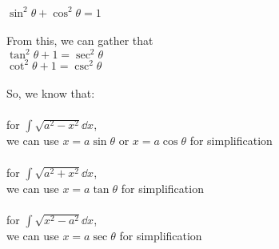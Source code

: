 $\sin^2\theta + \cos^2\theta = 1$\\
\\
From this, we can gather that\\
$\tan^2\theta + 1 = \sec^2\theta$\\
$\cot^2\theta + 1 = \csc^2\theta$\\
\\
So, we know that:\\
\\
for $\int\sqrt{a^2 - x^2} \dd x$,\\
we can use $x =  a\sin \theta$ or $x =  a\cos \theta$ for simplification\\
\\
for $\int\sqrt{a^2 + x^2} \dd x$,\\
we can use $x =  a\tan \theta$ for simplification\\
\\
for $\int\sqrt{x^2 - a^2} \dd x$,\\
we can use $x = a \sec \theta$ for simplification \\
